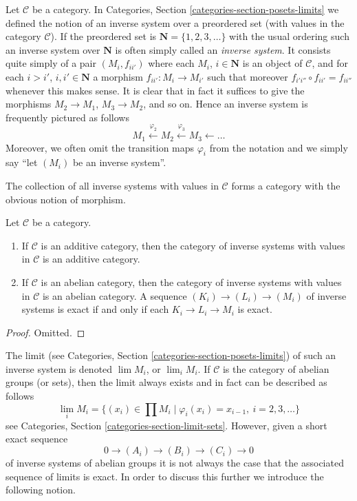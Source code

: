 \noindent
Let $\mathcal{C}$ be a category.
In Categories, Section \ref{categories-section-posets-limits}
we defined the notion of an inverse system over a preordered set
(with values in the category $\mathcal{C}$).
If the preordered set is $\mathbf{N} = \{1, 2, 3, \ldots\}$
with the usual ordering such an inverse system over $\mathbf{N}$
is often simply called an {\it inverse system}. It consists quite simply
of a pair $(M_i, f_{ii'})$ where each $M_i$, $i \in \mathbf{N}$
is an object of $\mathcal{C}$, and for each $i > i'$, $i, i' \in \mathbf{N}$
a morphism $f_{ii'} : M_i \to M_{i'}$ such that moreover
$f_{i'i''} \circ f_{ii'} = f_{ii''}$ whenever this makes sense.
It is clear that in fact it suffices to give the morphisms
$M_2 \to M_1$, $M_3 \to M_2$, and so on. Hence an inverse system
is frequently pictured as follows
$$
M_1 \xleftarrow{\varphi_2} M_2 \xleftarrow{\varphi_3} M_3 \leftarrow \ldots
$$
Moreover, we often omit the transition maps $\varphi_i$ from the notation
and we simply say ``let $(M_i)$ be an inverse system''.

\medskip\noindent
The collection of all inverse systems with values in
$\mathcal{C}$ forms a category with the obvious notion of morphism.

\begin{lemma}
\label{lemma-inverse-systems-abelian}
Let $\mathcal{C}$ be a category.
\begin{enumerate}
\item If $\mathcal{C}$ is an additive category, then the category
of inverse systems with values in $\mathcal{C}$ is an additive category.
\item If $\mathcal{C}$ is an abelian category, then the category
of inverse systems with values in $\mathcal{C}$ is an abelian category.
A sequence $(K_i) \to (L_i) \to (M_i)$ of inverse systems
is exact if and only if each $K_i \to L_i \to M_i$ is exact.
\end{enumerate}
\end{lemma}

\begin{proof}
Omitted.
\end{proof}

\noindent
The limit (see Categories, Section \ref{categories-section-posets-limits})
of such an inverse system is denoted $\lim M_i$, or $\lim_i M_i$.
If $\mathcal{C}$ is the category of abelian groups (or sets), then the limit
always exists and in fact can be described as follows
$$
\lim_i M_i
=
\{(x_i) \in \prod M_i \mid \varphi_i(x_i) = x_{i - 1}, \ i = 2, 3, \ldots\}
$$
see Categories, Section \ref{categories-section-limit-sets}.
However, given a short exact sequence
$$
0 \to (A_i) \to (B_i) \to (C_i) \to 0
$$
of inverse systems of abelian groups it is not always the case
that the associated sequence of limits is exact. In order to discuss
this further we introduce the following notion.

